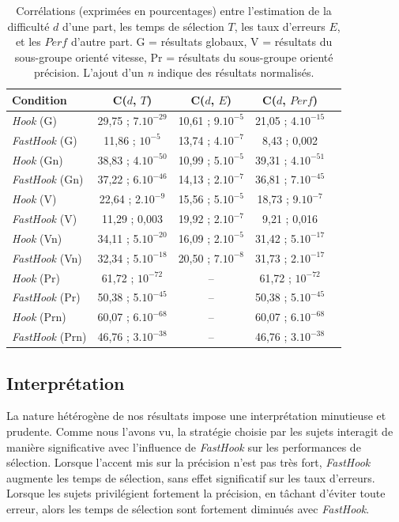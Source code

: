 	
\begin{table}
	\centering
	\begin{tabular}{l | c c c c}
		Condition				& C($d$, $T$)			& C($d$, $E$)			& C($d$, $Perf$)		\bigstrut[b] \\ \hline
		\emph{Hook} (G)			& 29,75 ; 7$.10^{-29}$	& 10,61 ; 9$.10^{-5}$	& 21,05 ; 4$.10^{-15}$	\bigstrut[t] \\
		\emph{FastHook} (G)		& 11,86 ; $10^{-5}$		& 13,74 ; 4$.10^{-7}$	& 8,43 ; 0,002			\\
		\emph{Hook} (Gn)		& 38,83 ; 4$.10^{-50}$	& 10,99 ; 5$.10^{-5}$	& 39,31 ; 4$.10^{-51}$	\\
		\emph{FastHook} (Gn)	& 37,22 ; 6$.10^{-46}$	& 14,13 ; 2$.10^{-7}$	& 36,81 ; 7$.10^{-45}$	\\
		\emph{Hook} (V)			& 22,64 ; 2$.10^{-9}$	& 15,56 ; 5$.10^{-5}$	& 18,73 ; 9$.10^{-7}$	\\
		\emph{FastHook} (V)		& 11,29 ; 0,003			& 19,92 ; 2$.10^{-7}$	& 9,21 ; 0,016			\\
		\emph{Hook} (Vn)		& 34,11 ; 5$.10^{-20}$	& 16,09 ; 2$.10^{-5}$	& 31,42 ; 5$.10^{-17}$	\\
		\emph{FastHook} (Vn)	& 32,34 ; 5$.10^{-18}$	& 20,50 ; 7$.10^{-8}$	& 31,73 ; 2$.10^{-17}$	\\
		\emph{Hook} (Pr)		& 61,72 ; $10^{-72}$	& --					& 61,72 ; $10^{-72}$	\\
		\emph{FastHook} (Pr)	& 50,38 ; 5$.10^{-45}$	& --					& 50,38 ; 5$.10^{-45}$	\\
		\emph{Hook} (Prn)		& 60,07 ; 6$.10^{-68}$	& --					& 60,07 ; 6$.10^{-68}$	\\
		\emph{FastHook} (Prn)	& 46,76 ; 3$.10^{-38}$	& --					& 46,76 ; 3$.10^{-38}$	\\
	\end{tabular}
	\caption[\emph{Hook} et \emph{FastHook} -- corrélations]{Corrélations (exprimées en pourcentages) entre l'estimation de la difficulté $d$ d'une part, les temps de sélection $T$, les taux d'erreurs $E$, et les $Perf$ d'autre part. G = résultats globaux, V = résultats du sous-groupe orienté vitesse, Pr = résultats du sous-groupe orienté précision. L'ajout d'un \emph{n} indique des résultats normalisés.}
	\label{tab:fastHookCorr}
\end{table}
	
	
	\subsection{Interprétation}
	La nature hétérogène de nos résultats impose une interprétation minutieuse et prudente. Comme nous l'avons vu, la stratégie choisie par les sujets interagit de manière significative avec l'influence de \emph{FastHook} sur les performances de sélection. Lorsque l'accent mis sur la précision n'est pas très fort, \emph{FastHook} augmente les temps de sélection, sans effet significatif sur les taux d'erreurs. Lorsque les sujets privilégient fortement la précision, en tâchant d'éviter toute erreur, alors les temps de sélection sont fortement diminués avec \emph{FastHook}.
	
